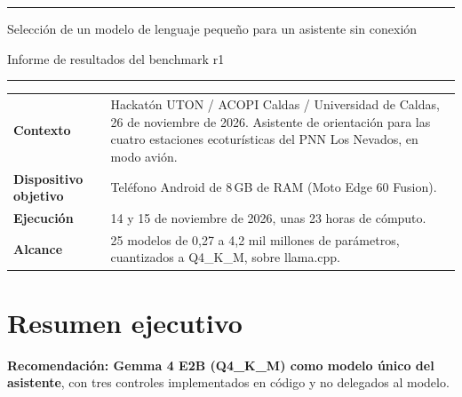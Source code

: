 \documentclass[11pt,a4paper]{article}
\begin{document}
\thispagestyle{empty}
\vspace*{-6mm}
{\color{accent}\rule{\textwidth}{1.2pt}}

\vspace{5mm}
{\huge\bfseries\raggedright Selección de un modelo de lenguaje pequeño para un asistente sin conexión\par}
\vspace{3mm}
{\Large Informe de resultados del benchmark r1\par}
\vspace{5mm}
{\color{accent}\rule{\textwidth}{0.4pt}}

\vspace{5mm}
\begin{tabularx}{\textwidth}{@{}lL@{}}
\textbf{Contexto} & Hackatón UTON / ACOPI Caldas / Universidad de Caldas, 26 de noviembre de 2026. Asistente de orientación para las cuatro estaciones ecoturísticas del PNN Los Nevados, en modo avión.\\[3pt]
\textbf{Dispositivo objetivo} & Teléfono Android de 8\,GB de RAM (Moto Edge 60 Fusion).\\[3pt]
\textbf{Ejecución} & 14 y 15 de noviembre de 2026, unas 23 horas de cómputo.\\[3pt]
\textbf{Alcance} & 25 modelos de 0,27 a 4,2 mil millones de parámetros, cuantizados a Q4\_K\_M, sobre llama.cpp.\\
\end{tabularx}

\vspace{6mm}
\section*{Resumen ejecutivo}

\textbf{Recomendación: Gemma 4 E2B (Q4\_K\_M) como modelo único del asistente}, con tres controles implementados en código y no delegados al modelo.
\end{document}
